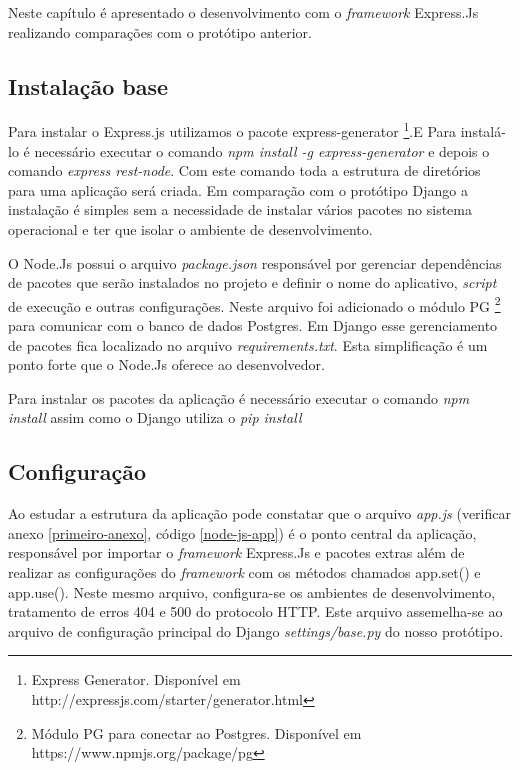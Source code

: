   Neste capítulo é apresentado o desenvolvimento com o \textit{framework} Express.Js realizando comparações com o protótipo
  anterior. 

\subsection{Instalação base}

  Para instalar o Express.js utilizamos o pacote express-generator \footnote[11]{Express Generator. Disponível em http://expressjs.com/starter/generator.html}.E
  Para instalá-lo é necessário executar o comando \textit{npm install -g express-generator} e depois o comando \textit{express rest-node}.
  Com este comando toda a estrutura de diretórios para uma aplicação será criada. Em comparação com o protótipo Django a instalação é
  simples sem a necessidade de instalar vários pacotes no sistema operacional e ter que isolar o ambiente de desenvolvimento.
  
  O Node.Js possui o arquivo \textit{package.json} responsável por gerenciar dependências de pacotes que serão instalados no projeto 
  e definir o nome do aplicativo, \textit{script} de execução e outras configurações. Neste arquivo foi adicionado o módulo PG \footnote[12]{Módulo PG para conectar ao Postgres. Disponível em https://www.npmjs.org/package/pg}
  para comunicar com o banco de dados Postgres. Em Django esse gerenciamento de pacotes fica localizado no arquivo
  \textit{requirements.txt}. Esta simplificação é um ponto forte que o Node.Js oferece ao desenvolvedor.
  
  Para instalar os pacotes da aplicação é necessário executar o comando \textit{npm install} assim como o Django utiliza o 
  \textit{pip install} 

\subsection{Configuração}

  Ao estudar a estrutura da aplicação pode constatar que o arquivo \textit{app.js} (verificar anexo \ref{primeiro-anexo}, código \ref{node-js-app})
  é o ponto central da aplicação, responsável por importar o \textit{framework} Express.Js e 
  pacotes extras além de realizar as configurações do \textit{framework} com os métodos chamados app.set() e app.use().
  Neste mesmo arquivo, configura-se os ambientes de desenvolvimento, tratamento de erros 404 e 500 do protocolo HTTP. 
  Este arquivo assemelha-se ao arquivo de configuração principal do Django \textit{settings/base.py} do nosso protótipo.

